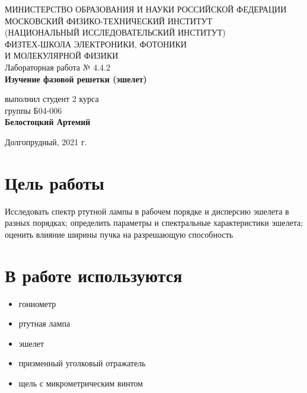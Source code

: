 \documentclass[a4paper,12pt]{article}
\begin{document}
 
\begin{titlepage}
	\begin{center}
		\large 	МИНИСТЕРСТВО ОБРАЗОВАНИЯ И НАУКИ РОССИЙСКОЙ ФЕДЕРАЦИИ\\
				МОСКОВСКИЙ ФИЗИКО-ТЕХНИЧЕСКИЙ ИНСТИТУТ \\
				(НАЦИОНАЛЬНЫЙ ИССЛЕДОВАТЕЛЬСКИЙ ИНСТИТУТ)\\ 
				ФИЗТЕХ-ШКОЛА ЭЛЕКТРОНИКИ, ФОТОНИКИ \\
				И МОЛЕКУЛЯРНОЙ ФИЗИКИ \\
		
		
		\vspace{4.0 cm}
		Лабораторная работа № 4.4.2 \\ 
		\LARGE \textbf{Изучение фазовой решетки (эшелет)}
	\end{center}
	\vspace{3 cm} \large
	
	\begin{flushright}
		выполнил студент 2 курса \\
		{группы Б04-006}\\
		\textbf{Белостоцкий Артемий}\\
	\end{flushright}
	
	\vfill

	\begin{center}
	Долгопрудный, 2021 г.
	\end{center}
\end{titlepage}                                                                      
 
\section*{Цель работы} 
 Исследовать спектр ртутной лампы в рабочем порядке и дисперсию эшелета в разных порядках; определить параметры и спектральные характеристики эшелета; оценить влияние ширины пучка на разрешающую способность

\section*{В работе используются}
	\begin{itemize}
		\item гониометр
		\item ртутная лампа
		\item эшелет 
		\item призменный уголковый отражатель 
		\item щель с микрометрическим винтом
	\end{itemize}
 
\end{document}
